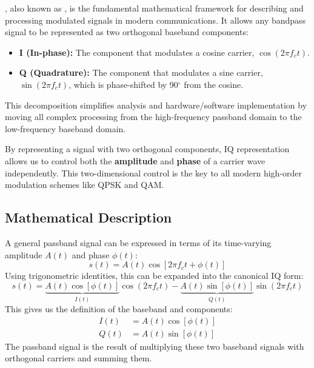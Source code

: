 , also known as , is the fundamental mathematical framework for describing and processing modulated signals in modern communications. It allows any bandpass signal to be represented as two orthogonal baseband components:
\begin{itemize}
    \item \textbf{I (In-phase):} The component that modulates a cosine carrier, $\cos(2\pi f_c t)$.
    \item \textbf{Q (Quadrature):} The component that modulates a sine carrier, $\sin(2\pi f_c t)$, which is phase-shifted by 90$^\circ$ from the cosine.
\end{itemize}
This decomposition simplifies analysis and hardware/software implementation by moving all complex processing from the high-frequency passband domain to the low-frequency baseband domain.

\begin{keyconcept}
    By representing a signal with two orthogonal components, IQ representation allows us to control both the \textbf{amplitude} and \textbf{phase} of a carrier wave independently. This two-dimensional control is the key to all modern high-order modulation schemes like QPSK and QAM.
\end{keyconcept}


\subsection{Mathematical Description}

A general passband signal can be expressed in terms of its time-varying amplitude $A(t)$ and phase $\phi(t)$:
\begin{equation}
    s(t) = A(t) \cos[2\pi f_c t + \phi(t)]
\end{equation}
Using trigonometric identities, this can be expanded into the canonical IQ form:
\begin{equation}
    s(t) = \underbrace{A(t)\cos[\phi(t)]}_{I(t)} \cos(2\pi f_c t) - \underbrace{A(t)\sin[\phi(t)]}_{Q(t)} \sin(2\pi f_c t)
\end{equation}
This gives us the definition of the baseband  and  components:
\begin{align}
    I(t) &= A(t)\cos[\phi(t)] \\
    Q(t) &= A(t)\sin[\phi(t)]
\end{align}
The passband signal is the result of multiplying these two baseband signals with orthogonal carriers and summing them.

